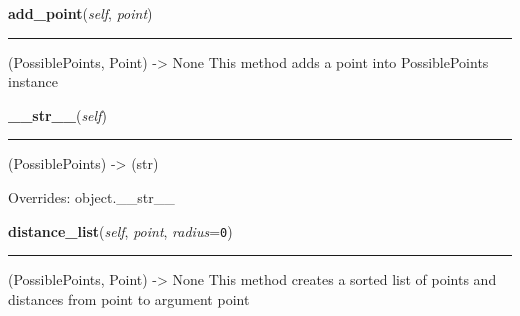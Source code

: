     \label{possible_points:PossiblePoints:add_point}

    \vspace{0.5ex}

\hspace{.8\funcindent}\begin{boxedminipage}{\funcwidth}

    \raggedright \textbf{add\_point}(\textit{self}, \textit{point})

    \vspace{-1.5ex}

    \rule{\textwidth}{0.5\fboxrule}
\setlength{\parskip}{2ex}
    (PossiblePoints, Point) -{\textgreater} None This method adds a point 
    into PossiblePoints instance

\setlength{\parskip}{1ex}
    \end{boxedminipage}

    \vspace{0.5ex}

\hspace{.8\funcindent}\begin{boxedminipage}{\funcwidth}

    \raggedright \textbf{\_\_str\_\_}(\textit{self})

    \vspace{-1.5ex}

    \rule{\textwidth}{0.5\fboxrule}
\setlength{\parskip}{2ex}
    (PossiblePoints) -{\textgreater} (str)

\setlength{\parskip}{1ex}
      Overrides: object.\_\_str\_\_

    \end{boxedminipage}

    \label{possible_points:PossiblePoints:distance_list}

    \vspace{0.5ex}

\hspace{.8\funcindent}\begin{boxedminipage}{\funcwidth}

    \raggedright \textbf{distance\_list}(\textit{self}, \textit{point}, \textit{radius}={\tt 0})

    \vspace{-1.5ex}

    \rule{\textwidth}{0.5\fboxrule}
\setlength{\parskip}{2ex}
    (PossiblePoints, Point) -{\textgreater} None This method creates a 
    sorted list of points and distances from point to argument point

\setlength{\parskip}{1ex}
    \end{boxedminipage}


